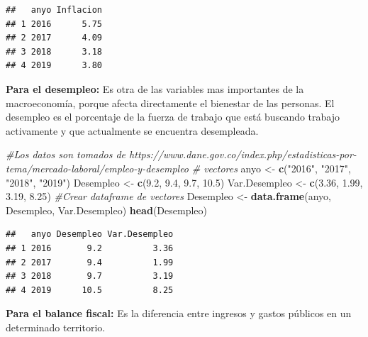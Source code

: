 \documentclass[
  11pt,
]{article}
\newenvironment{Shaded}{\begin{snugshade}}{\end{snugshade}}
\newcommand{\CommentTok}[1]{\textcolor[rgb]{0.56,0.35,0.01}{\textit{#1}}}
\newcommand{\FloatTok}[1]{\textcolor[rgb]{0.00,0.00,0.81}{#1}}
\newcommand{\KeywordTok}[1]{\textcolor[rgb]{0.13,0.29,0.53}{\textbf{#1}}}
\newcommand{\NormalTok}[1]{#1}
\newcommand{\StringTok}[1]{\textcolor[rgb]{0.31,0.60,0.02}{#1}}
\begin{document}
\begin{verbatim}
##   anyo Inflacion
## 1 2016      5.75
## 2 2017      4.09
## 3 2018      3.18
## 4 2019      3.80
\end{verbatim}

\textbf{Para el desempleo:} Es otra de las variables mas importantes de
la macroeconomía, porque afecta directamente el bienestar de las
personas. El desempleo es el porcentaje de la fuerza de trabajo que está
buscando trabajo activamente y que actualmente se encuentra desempleada.

\begin{Shaded}
\begin{Highlighting}[]
\CommentTok{#Los datos son tomados de https://www.dane.gov.co/index.php/estadisticas-por-tema/mercado-laboral/empleo-y-desempleo}
\CommentTok{# vectores }
\NormalTok{anyo <-}\StringTok{ }\KeywordTok{c}\NormalTok{(}\StringTok{"2016"}\NormalTok{, }\StringTok{"2017"}\NormalTok{, }\StringTok{"2018"}\NormalTok{, }\StringTok{"2019"}\NormalTok{)}
\NormalTok{Desempleo <-}\StringTok{ }\KeywordTok{c}\NormalTok{(}\FloatTok{9.2}\NormalTok{, }\FloatTok{9.4}\NormalTok{, }\FloatTok{9.7}\NormalTok{, }\FloatTok{10.5}\NormalTok{)}
\NormalTok{Var.Desempleo <-}\StringTok{ }\KeywordTok{c}\NormalTok{(}\FloatTok{3.36}\NormalTok{, }\FloatTok{1.99}\NormalTok{, }\FloatTok{3.19}\NormalTok{, }\FloatTok{8.25}\NormalTok{)}
\CommentTok{#Crear dataframe de vectores}
\NormalTok{Desempleo <-}\StringTok{ }\KeywordTok{data.frame}\NormalTok{(anyo, Desempleo, Var.Desempleo)}
\KeywordTok{head}\NormalTok{(Desempleo)}
\end{Highlighting}
\end{Shaded}

\begin{verbatim}
##   anyo Desempleo Var.Desempleo
## 1 2016       9.2          3.36
## 2 2017       9.4          1.99
## 3 2018       9.7          3.19
## 4 2019      10.5          8.25
\end{verbatim}

\textbf{Para el balance fiscal:} Es la diferencia entre ingresos y
gastos públicos en un determinado territorio.
\end{document}
